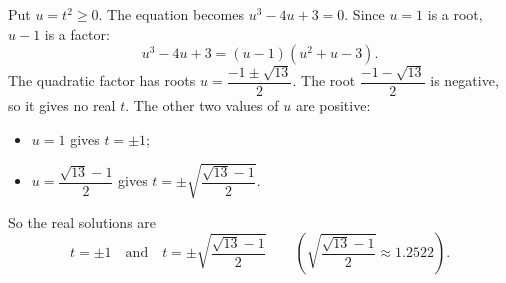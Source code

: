 Put $u=t^2\ge0$. The equation becomes $u^3-4u+3=0$. Since $u=1$ is a root, $u-1$ is a factor:
\[
u^3-4u+3=(u-1)(u^2+u-3).
\]
The quadratic factor has roots $u=\dfrac{-1\pm\sqrt{13}}{2}$. The root $\dfrac{-1-\sqrt{13}}{2}$ is negative, so it gives no real $t$. The other two values of $u$ are positive:
\begin{itemize}
\item $u=1$ gives $t=\pm1$;
\item $u=\dfrac{\sqrt{13}-1}{2}$ gives $t=\pm\sqrt{\dfrac{\sqrt{13}-1}{2}}$.
\end{itemize}
So the real solutions are
\[
\boxed{t=\pm1\quad\text{and}\quad t=\pm\sqrt{\dfrac{\sqrt{13}-1}{2}}}\qquad\left(\sqrt{\dfrac{\sqrt{13}-1}{2}}\approx1.2522\right).
\]
